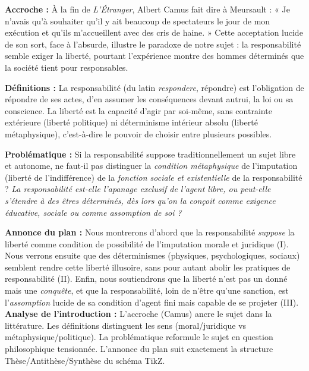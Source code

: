 \documentclass[11pt]{article}
\newcommand{\cle}[1]{{\popxbold\color{popdark}#1}}
\begin{document}
\begin{exoresolu}
\textbf{Accroche :} À la fin de \emph{L'Étranger}, Albert Camus fait dire à Meursault : « Je n'avais qu'à souhaiter qu'il y ait beaucoup de spectateurs le jour de mon exécution et qu'ils m'accueillent avec des cris de haine. » Cette acceptation lucide de son sort, face à l'absurde, illustre le paradoxe de notre sujet : la responsabilité semble exiger la liberté, pourtant l'expérience montre des hommes déterminés que la société tient pour responsables.

\textbf{Définitions :} La \cle{responsabilité} (du latin \emph{respondere}, répondre) est l'obligation de répondre de ses actes, d'en assumer les conséquences devant autrui, la loi ou sa conscience. La \cle{liberté} est la capacité d'agir par soi-même, sans contrainte extérieure (liberté politique) ni déterminisme intérieur absolu (liberté métaphysique), c'est-à-dire le pouvoir de choisir entre plusieurs possibles.

\textbf{Problématique :} Si la responsabilité suppose traditionnellement un sujet libre et autonome, ne faut-il pas distinguer la \emph{condition métaphysique} de l'imputation (liberté de l'indifférence) de la \emph{fonction sociale et existentielle} de la responsabilité ? \emph{La responsabilité est-elle l'apanage exclusif de l'agent libre, ou peut-elle s'étendre à des êtres déterminés, dès lors qu'on la conçoit comme exigence éducative, sociale ou comme assomption de soi ?}

\textbf{Annonce du plan :} Nous montrerons d'abord que la responsabilité \emph{suppose} la liberté comme condition de possibilité de l'imputation morale et juridique (I). Nous verrons ensuite que des déterminismes (physiques, psychologiques, sociaux) semblent rendre cette liberté illusoire, sans pour autant abolir les pratiques de responsabilité (II). Enfin, nous soutiendrons que la liberté n'est pas un donné mais une \emph{conquête}, et que la responsabilité, loin de n'être qu'une sanction, est l'\emph{assomption} lucide de sa condition d'agent fini mais capable de se projeter (III).
\tcblower
\textbf{Analyse de l'introduction :} L'accroche (Camus) ancre le sujet dans la littérature. Les définitions distinguent les sens (moral/juridique vs métaphysique/politique). La problématique reformule le sujet en question philosophique tensionnée. L'annonce du plan suit exactement la structure Thèse/Antithèse/Synthèse du schéma TikZ.
\end{exoresolu}
\end{document}
